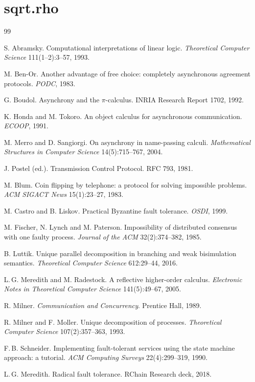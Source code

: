 \documentclass[11pt]{article}
\theoremstyle{definition}
\begin{document}
\appendix

\section{sqrt.rho}\label{app:rho}



\begin{thebibliography}{99}

 S. Abramsky. Computational interpretations of linear logic. \emph{Theoretical Computer Science} 111(1--2):3--57, 1993.

 M. Ben-Or. Another advantage of free choice: completely asynchronous agreement protocols. \emph{PODC}, 1983.

 G. Boudol. Asynchrony and the $\pi$-calculus. INRIA Research Report 1702, 1992.

 K. Honda and M. Tokoro. An object calculus for asynchronous communication. \emph{ECOOP}, 1991.

 M. Merro and D. Sangiorgi. On asynchrony in name-passing calculi. \emph{Mathematical Structures in Computer Science} 14(5):715--767, 2004.

 J. Postel (ed.). Transmission Control Protocol. RFC 793, 1981.

 M. Blum. Coin flipping by telephone: a protocol for solving impossible problems. \emph{ACM SIGACT News} 15(1):23--27, 1983.

 M. Castro and B. Liskov. Practical Byzantine fault tolerance. \emph{OSDI}, 1999.

 M. Fischer, N. Lynch and M. Paterson. Impossibility of distributed consensus with one faulty process. \emph{Journal of the ACM} 32(2):374--382, 1985.

 B. Luttik. Unique parallel decomposition in branching and weak bisimulation semantics. \emph{Theoretical Computer Science} 612:29--44, 2016.

 L.\,G. Meredith and M. Radestock. A reflective higher-order calculus. \emph{Electronic Notes in Theoretical Computer Science} 141(5):49--67, 2005.

 R. Milner. \emph{Communication and Concurrency}. Prentice Hall, 1989.

 R. Milner and F. Moller. Unique decomposition of processes. \emph{Theoretical Computer Science} 107(2):357--363, 1993.

 F.\,B. Schneider. Implementing fault-tolerant services using the state machine approach: a tutorial. \emph{ACM Computing Surveys} 22(4):299--319, 1990.

 L.\,G. Meredith. Radical fault tolerance. RChain Research deck, 2018.

\end{thebibliography}
\end{document}
